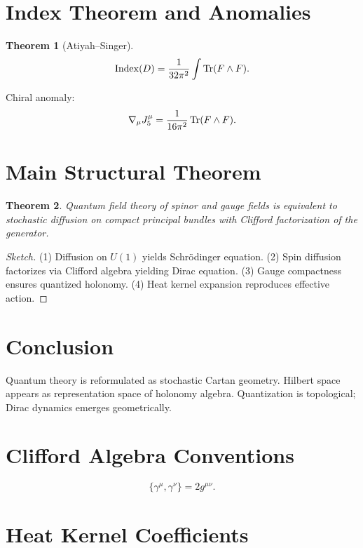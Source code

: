 \documentclass[11pt]{article}
\newtheorem{theorem}{Theorem}[section]
\theoremstyle{remark}
\begin{document}
\section{Index Theorem and Anomalies}

\begin{theorem}[Atiyah--Singer]
\[
\mathrm{Index}(D)=\frac{1}{32\pi^2}\int \Tr(F\wedge F).
\]
\end{theorem}

Chiral anomaly:
\[
\nabla_\mu J_5^\mu = \frac{1}{16\pi^2}\Tr(F\wedge F).
\]

\section{Main Structural Theorem}

\begin{theorem}
Quantum field theory of spinor and gauge fields is equivalent to stochastic diffusion on compact principal bundles with Clifford factorization of the generator.
\end{theorem}

\begin{proof}[Sketch]
(1) Diffusion on $U(1)$ yields Schr\"odinger equation.  
(2) Spin diffusion factorizes via Clifford algebra yielding Dirac equation.  
(3) Gauge compactness ensures quantized holonomy.  
(4) Heat kernel expansion reproduces effective action.  
\end{proof}

\section{Conclusion}

Quantum theory is reformulated as stochastic Cartan geometry. 
Hilbert space appears as representation space of holonomy algebra. 
Quantization is topological; Dirac dynamics emerges geometrically.

\appendix

\section{Clifford Algebra Conventions}

\[
\{\gamma^\mu,\gamma^\nu\}=2g^{\mu\nu}.
\]

\section{Heat Kernel Coefficients}
\end{document}
